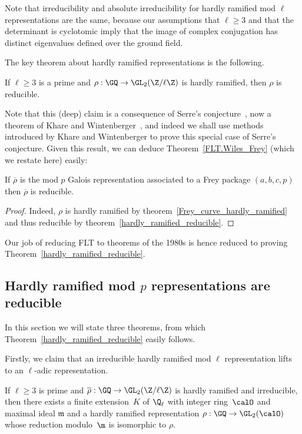 Note that irreducibility and absolute irreducibility for hardly ramified mod $\ell$ representations
are the same, because our assumptions that $\ell\geq3$
and that the determinant is cyclotomic imply that the image of complex conjugation
has distinct eigenvalues defined over the ground field.

The key theorem about hardly ramified representations is the following.

\begin{theorem}
  \label{hardly_ramified_reducible}
  If $\ell\geq 3$ is a prime and $\rho:\GQ\to\GL_2(\Z/\ell\Z)$ is hardly ramified,
  then $\rho$ is reducible.
\end{theorem}


Note that this (deep) claim is a consequence of Serre's conjecture~\cite{serreconj},
now a theorem of Khare and Wintenberger~\cite{kwII}, and indeed we shall use
methods introduced by Khare and Wintenberger to prove this special case of
Serre's conjecture. Given this result, we can deduce Theorem~\ref{FLT.Wiles_Frey}
(which we restate here) easily:

\begin{theorem}
  \label{FLT.Wiles_Frey'}
  \leanok
  If $\overline{\rho}$ is the mod $p$ Galois representation associated to a Frey package $(a,b,c,p)$ then
  $\overline{\rho}$ is reducible.
\end{theorem}
\begin{proof}
  Indeed, $\rho$ is hardly ramified by theorem~\ref{Frey_curve_hardly_ramified}
  and thus reducible by theorem~\ref{hardly_ramified_reducible}.
\end{proof}

Our job of reducing FLT to theorems of the 1980s is hence reduced to proving
Theorem~\ref{hardly_ramified_reducible}.

\subsection{Hardly ramified mod $p$ representations are reducible}

In this section we will state three theorems, from which Theorem~\ref{hardly_ramified_reducible}
easily follows.

Firstly, we claim that
an irreducible hardly ramified mod $\ell$ representation lifts to an $\ell$-adic representation.

\begin{theorem}
  \label{hardly-ramified-lifts}
  If $\ell\geq3$ is prime and $\overline{\rho}:\GQ\to\GL_2(\Z/\ell\Z)$
  is hardly ramified and irreducible, then there exists a finite extension~$K$ of $\Q_\ell$
  with integer ring~$\calO$ and maximal ideal $\mathfrak{m}$
  and a hardly ramified representation
  $\rho:\GQ\to\GL_2(\calO)$ whose reduction modulo~$\m$ is isomorphic to $\rho$.
\end{theorem}

